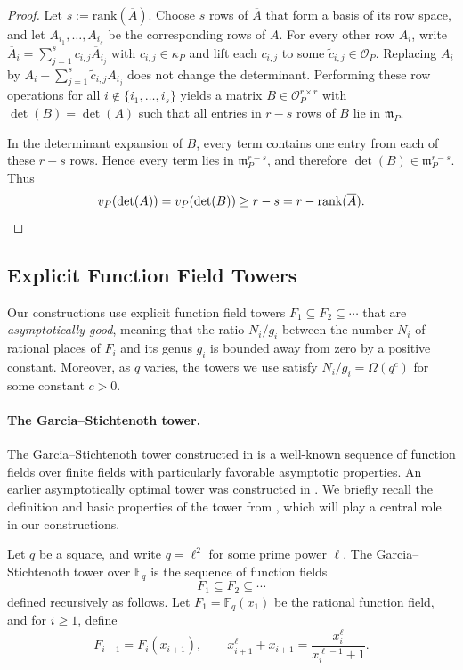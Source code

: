 \documentclass[11pt]{article}
\newcommand{\rank}{\mathrm{rank}}
\newcommand{\F}{\mathbb{F}}
\begin{document}
\begin{proof}
Let $s:=\rank(\overline{A})$. Choose $s$ rows of $\overline{A}$ that form a basis
of its row space, and let $A_{i_1},\dots,A_{i_s}$ be the corresponding rows of
$A$. For every other row $A_i$, write
$\overline{A}_i=\sum_{j=1}^s c_{i,j}\overline{A}_{i_j}$ with $c_{i,j}\in\kappa_P$
and lift each $c_{i,j}$ to some $\widetilde c_{i,j}\in\mathcal O_P$.
Replacing $A_i$ by $A_i-\sum_{j=1}^s \widetilde c_{i,j}A_{i_j}$
does not change the determinant. Performing these row operations for all
$i\notin\{i_1,\dots,i_s\}$ yields a matrix $B\in\mathcal O_P^{r\times r}$
with $\det(B)=\det(A)$ such that all entries in $r-s$ rows of $B$ lie in
$\mathfrak m_P$.

In the determinant expansion of $B$, every term contains one entry from each
of these $r-s$ rows. Hence every term lies in $\mathfrak m_P^{r-s}$, and therefore $\det(B)\in\mathfrak m_P^{r-s}$.
Thus
\[
v_P(\det(A))
=
v_P(\det(B))
\ge r-s
=
r-\rank(\overline{A}).\qedhere
\]
\end{proof}

\subsection{Explicit Function Field Towers}

Our constructions use explicit function field towers $F_1\subseteq F_2\subseteq \cdots$ that are \emph{asymptotically good}, meaning that the ratio $N_i/g_i$ between the number $N_i$ of rational places of $F_i$ and its genus $g_i$ is bounded away from zero by a positive constant. Moreover, as $q$ varies, the towers we use satisfy $N_i/g_i = \Omega(q^c)$ for some constant $c>0$.

\paragraph{The Garcia--Stichtenoth tower.}

The Garcia--Stichtenoth tower constructed in \cite{GS96} is a well-known sequence
of function fields over finite fields with particularly favorable asymptotic properties.
An earlier asymptotically optimal tower was constructed in \cite{GS95}.
We briefly recall the definition and basic properties of the tower from \cite{GS96},
which will play a central role in our constructions. %

\begin{definition}
Let $q$ be a square, and write $q=\ell^2$ for some prime power $\ell$.
The Garcia--Stichtenoth tower over $\F_q$ is the sequence of function fields
\[
F_1 \subseteq F_2 \subseteq \cdots
\]
defined recursively as follows.
Let $F_1=\F_q(x_1)$ be the rational function field, and for $i\ge 1$, define
\[
F_{i+1}=F_i(x_{i+1}),
\qquad
x_{i+1}^\ell + x_{i+1} = \frac{x_i^\ell}{x_i^{\ell-1}+1}.
\]
\end{definition}
\end{document}

